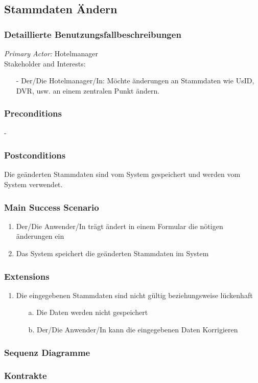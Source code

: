 \documentclass[./detailed_overview_usecases.tex]{subfiles}
\begin{document}
    \subsection{Stammdaten Ändern}
    \subsubsection{Detaillierte Benutzungsfallbeschreibungen}
    \textit{Primary Actor:}
    Hotelmanager
    \\
    Stakeholder and Interests:
    \begin{itemize}
        \item[-] Der/Die Hotelmanager/In: Möchte änderungen an Stammdaten wie UsID, DVR, usw. an  einem zentralen Punkt ändern.
    \end{itemize}

    \subsubsection*{Preconditions}
    -
    \subsubsection*{Postconditions}
    Die geänderten Stammdaten sind vom System gespeichert und werden vom System verwendet.

    \subsubsection*{Main Success Scenario}
    \begin{enumerate}
        \item Der/Die Anwender/In trägt ändert in einem Formular die nötigen änderungen ein
        \item Das System speichert die geänderten Stammdaten im System
    \end{enumerate}

    \subsubsection*{Extensions}
    \begin{enumerate}
        \item Die eingegebenen Stammdaten sind nicht gültig beziehungsweise lückenhaft
        \begin{itemize}
            \item[a.] Die Daten werden nicht gespeichert
            \item[b.] Der/Die Anwender/In kann die eingegebenen Daten Korrigieren
        \end{itemize}
    \end{enumerate}

    \subsubsection{Sequenz Diagramme}
    \subsubsection{Kontrakte}
\end{document}
